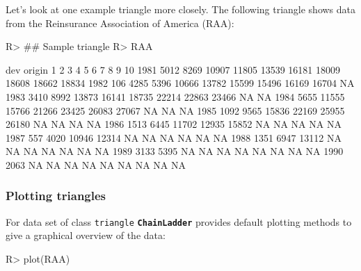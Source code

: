 \documentclass{article}
\newcommand{\chainladder}{\textbf{\texttt{ChainLadder}} }
\begin{document}
Let's look at one example triangle more closely. The following triangle shows 
data from the Reinsurance Association of America (RAA):
\begin{Schunk}
\begin{Sinput}
R> ## Sample triangle
R> RAA
\end{Sinput}
\begin{Soutput}
      dev
origin    1     2     3     4     5     6     7     8     9    10
  1981 5012  8269 10907 11805 13539 16181 18009 18608 18662 18834
  1982  106  4285  5396 10666 13782 15599 15496 16169 16704    NA
  1983 3410  8992 13873 16141 18735 22214 22863 23466    NA    NA
  1984 5655 11555 15766 21266 23425 26083 27067    NA    NA    NA
  1985 1092  9565 15836 22169 25955 26180    NA    NA    NA    NA
  1986 1513  6445 11702 12935 15852    NA    NA    NA    NA    NA
  1987  557  4020 10946 12314    NA    NA    NA    NA    NA    NA
  1988 1351  6947 13112    NA    NA    NA    NA    NA    NA    NA
  1989 3133  5395    NA    NA    NA    NA    NA    NA    NA    NA
  1990 2063    NA    NA    NA    NA    NA    NA    NA    NA    NA
\end{Soutput}
\end{Schunk}

\subsubsection{Plotting triangles}
For data set of class \texttt{triangle} \chainladder provides
default plotting methods to give a graphical overview of the data:
\begin{Schunk}
\begin{Sinput}
R> plot(RAA)
\end{Sinput}
\end{Schunk}
\end{document}
